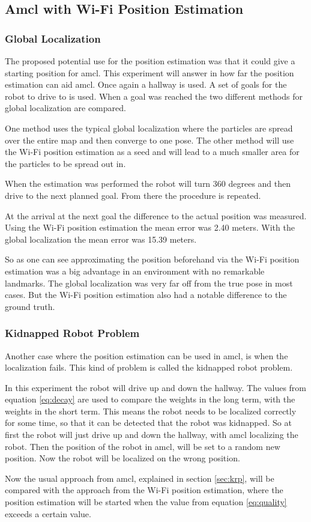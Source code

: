 \subsection{Amcl with Wi-Fi Position Estimation}
\subsubsection{Global Localization}
The proposed potential use for the position estimation was that it could give a starting position for amcl. This experiment will answer in how far the position estimation can aid amcl. Once again a hallway is used. A set of goals for the robot to drive to is used. When a goal was reached the two different methods for global localization are compared.

One method uses the typical global localization where the particles are spread over the entire map and then converge to one pose. The other method will use the Wi-Fi position estimation as a seed and will lead to a much smaller area for the particles to be spread out in. 

When the estimation was performed the robot will turn 360 degrees and then drive to the next planned goal. From there the procedure is repeated. 

At the arrival at the next goal the difference to the actual position was measured. Using the Wi-Fi position estimation the mean error was 2.40 meters. With the global localization the mean error was 15.39 meters. 

So as one can see approximating the position beforehand via the Wi-Fi position estimation was a big advantage in an environment with no remarkable landmarks. The global localization was very far off from the true pose in most cases. But the Wi-Fi position estimation also had a notable difference to the ground truth. 
\subsubsection{Kidnapped Robot Problem}
Another case where the position estimation can be used in amcl, is when the localization fails. This kind of problem is called the kidnapped robot problem. 

In this experiment the robot will drive up and down the hallway. The values from equation \ref{eq:decay} are used to compare the weights in the long term, with the weights in the short term. This means the robot needs to be localized correctly for some time, so that it can be detected that the robot was kidnapped. So at first the robot will just drive up and down the hallway, with amcl localizing the robot. Then the position of the robot in amcl, will be set to a random new position. Now the robot will be localized on the wrong position. 

Now the usual approach from amcl, explained in section \ref{sec:krp}, will be compared with the approach from the Wi-Fi position estimation, where the position estimation will be started when the value from equation \ref{eq:quality} exceeds a certain value. 